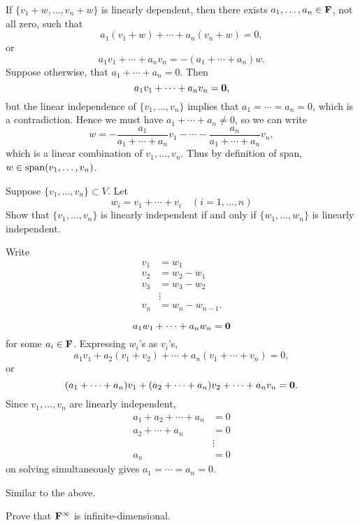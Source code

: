 \begin{solution}
If $\{v_1+w,\dots,v_n+w\}$ is linearly dependent, then there exists $a_1,\dots,a_n\in\mathbf F$, not all zero, such that
\[a_1(v_1+w)+\cdots+a_n(v_n+w)=0,\]
or
\[a_1v_1+\cdots+a_nv_n=-(a_1+\cdots+a_n)w.\]
Suppose otherwise, that $a_1+\cdots+a_n=0$. Then
\[a_1v_1+\cdots+a_nv_n=\vb{0},\]
but the linear independence of $\{v_1,\dots,v_n\}$ implies that $a_1=\cdots=a_n=0$, which is a contradiction. Hence we must have $a_1+\cdots+a_n\neq0$, so we can write
\[w=-\frac{a_1}{a_1+\cdots+a_n}v_1-\cdots-\frac{a_n}{a_1+\cdots+a_n}v_n,\]
which is a linear combination of $v_1,\dots,v_n$. Thus by definition of span, $w\in\operatorname{span}(v_1,\dots,v_n)$.
\end{solution}

\begin{exercise}
Suppose $\{v_1,\dots,v_n\}\subset V$. Let
\[w_i=v_1+\cdots+v_i\quad(i=1,\dots,n)\]
Show that $\{v_1,\dots,v_n\}$ is linearly independent if and only if $\{w_1,\dots,w_n\}$ is linearly independent.
\end{exercise}

\begin{solution}
Write
\begin{align*}
v_1&=w_1\\
v_2&=w_2-w_1\\
v_3&=w_3-w_2\\
&\vdots\\
v_n&=w_n-w_{n-1}.
\end{align*}

\fbox{$\implies$}
\[a_1w_1+\cdots+a_nw_n=\vb{0}\]
for some $a_i\in\mathbf F$. Expressing $w_i$'s as $v_i$'s,
\[a_1v_1+a_2(v_1+v_2)+\cdots+a_n(v_1+\cdots+v_n)=0,\]
or
\[(a_1+\cdots+a_n)v_1+(a_2+\cdots+a_n)v_2+\cdots+a_nv_n=\vb{0}.\]
Since $v_1,\dots,v_n$ are linearly independent,
\begin{align*}
a_1+a_2+\cdots+a_n&=0\\
a_2+\cdots+a_n&=0\\
&\vdots\\
a_n&=0
\end{align*}
on solving simultaneously gives $a_1=\cdots=a_n=0$.

\fbox{$\impliedby$} Similar to the above.
\end{solution}

\begin{exercise}
Prove that $\mathbf F^\infty$ is infinite-dimensional.
\end{exercise}

